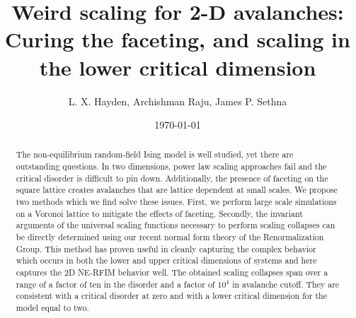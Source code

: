 \documentclass[reprint,amsmath,amssymb,aps,floatfix]{revtex4-1}
\begin{document}
%
\title{Weird scaling for 2-D avalanches: \\Curing the faceting, and scaling in the lower critical dimension}
%
\author{L. X. Hayden, Archishman Raju, James P. Sethna}
%
\date{\today}
%
\begin{abstract}
The non-equilibrium random-field Ising model is well studied, yet there are outstanding questions. In two dimensions, power law scaling approaches fail and the critical disorder is difficult to pin down. Additionally, the presence of faceting on the square lattice creates avalanches that are lattice dependent at small scales. We propose two methods which we find solve these issues. First, we perform large scale simulations on a Voronoi lattice to mitigate the effects of faceting. Secondly, the invariant arguments of the universal scaling functions necessary to perform scaling collapses can be directly determined using our recent normal form theory of the Renormalization Group. This method has proven useful in cleanly capturing the complex behavior which occurs in both the lower and upper critical dimensions of systems and here captures the 2D NE-RFIM behavior well. The obtained scaling collapses span over a range of a factor of ten in the disorder and a factor of $10^4$ in avalanche cutoff. They are consistent with a critical disorder at zero and with a lower critical dimension for the model equal to two. 
\end{abstract}
%
\maketitle
\end{document}
